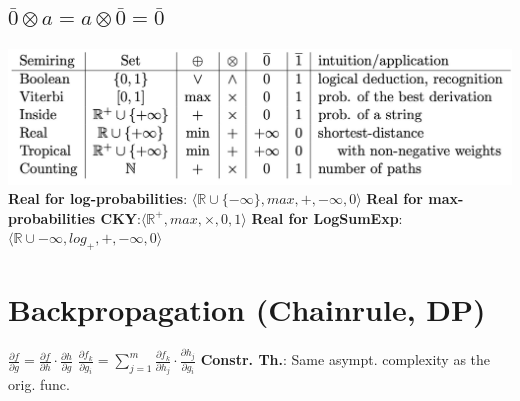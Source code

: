 \documentclass[a4paper, 11pt, landscape]{article}
\begin{document}
\begin{multicols*}{3}
\subsection{$\bar{0}\otimes a = a\otimes \bar{0}=\bar{0}$}
\includegraphics[scale=0.4]{semirings}
\textbf{Real for log-probabilities}: $\langle\mathbb{R}\cup\{-\infty\},max,+,-\infty,0\rangle$\newline
\textbf{Real for max-probabilities CKY}:$\langle\mathbb{R}^+,max,\times,0,1\rangle$\newline
\textbf{Real for LogSumExp}:$\langle\mathbb{R}\cup-\infty,log_+,+,-\infty,0\rangle$

\section{Backpropagation (Chainrule, DP)}
$\frac{\partial f}{\partial g}=\frac{\partial f}{\partial h}\cdot \frac{\partial h}{\partial g}$\quad
$\frac{\partial f_k}{\partial g_i}=\sum_{j=1}^{m}{\frac{\partial f_k}{\partial h_j}\cdot \frac{\partial h_j}{\partial g_i}}$\newline
\textbf{Constr. Th.}: Same asympt. complexity as the orig. func.


\end{multicols*}
\end{document}

